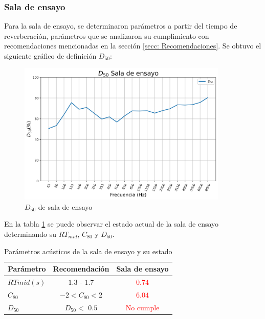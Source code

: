 \subsubsection{Sala de ensayo}
    Para la sala de ensayo, se determinaron parámetros a partir del tiempo de reverberación, parámetros que se analizaron su cumplimiento con recomendaciones mencionadas en la sección \ref{secc: Recomendaciones}.
    Se obtuvo el siguiente gráfico de definición $D_{50}$:
    \begin{figure}[H]
        \centering
        \includegraphics[width=10cm]{Imagenes/Resultados/D50_ensayo.png}
        \caption{$D_{50}$ de sala de ensayo}
    \end{figure}
    En la tabla \ref{tab:parametros acusticos sala ensayo} se puede observar el estado actual de la sala de ensayo determinando su $RT_{mid}$, $C_{80}$ y $D_{50}$.
    \begin{table}[H]
        \centering
        \begin{tabular}{|l|c|c|}
        \hline
        \textbf{Parámetro}& \textbf{Recomendación} & \textbf{Sala de ensayo}\\ \hline
        $RT{mid} (s)$ &  $1.3$ - $1.7$  & \textcolor{red}{$0.74$} \\ \hline
        $C_{80}$      & $-2<C_{80}<2$   & \textcolor{red}{$6.04$} \\\hline
        $D_{50}$      & $D_{50}<$ $0.5$   & \textcolor{red}{No cumple} \\\hline
        \end{tabular}
        \caption{Parámetros acústicos de la sala de ensayo y su estado}
        \label{tab:parametros acusticos sala ensayo}
    \end{table}
